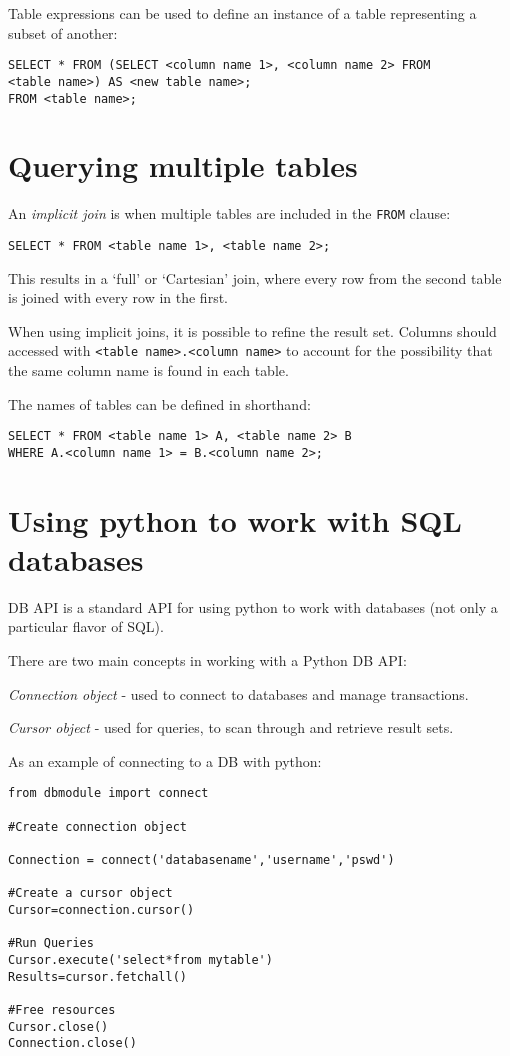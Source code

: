 \documentclass[]{article}
\begin{document}
Table expressions can be used to define an instance of a table representing a subset of another:

\begin{verbatim}
SELECT * FROM (SELECT <column name 1>, <column name 2> FROM 
<table name>) AS <new table name>; 
FROM <table name>;
\end{verbatim}

\section{Querying multiple tables}

An \emph{implicit join} is when multiple tables are included in the \verb|FROM| clause:

\begin{verbatim}
SELECT * FROM <table name 1>, <table name 2>;
\end{verbatim}

This results in a `full' or `Cartesian' join, where every row from the second table is joined with every row in the first.

When using implicit joins, it is possible to refine the result set.  Columns should accessed with \verb|<table name>.<column name>| to account for the possibility that the same column name is found in each table.

The names of tables can be defined in shorthand:

\begin{verbatim}
SELECT * FROM <table name 1> A, <table name 2> B 
WHERE A.<column name 1> = B.<column name 2>;
\end{verbatim}

\section{Using python to work with SQL databases}

DB API is a standard API for using python to work with databases (not only a particular flavor of SQL).

There are two main concepts in working with a Python DB API:

\emph{Connection object} - used to connect to databases and manage transactions.

\emph{Cursor object} - used for queries, to scan through and retrieve result sets.

As an example of connecting to a DB with python:

\begin{verbatim}
from dbmodule import connect

#Create connection object

Connection = connect('databasename','username','pswd')

#Create a cursor object
Cursor=connection.cursor()

#Run Queries
Cursor.execute('select*from mytable')
Results=cursor.fetchall()

#Free resources
Cursor.close()
Connection.close()
\end{verbatim}
\end{document}
